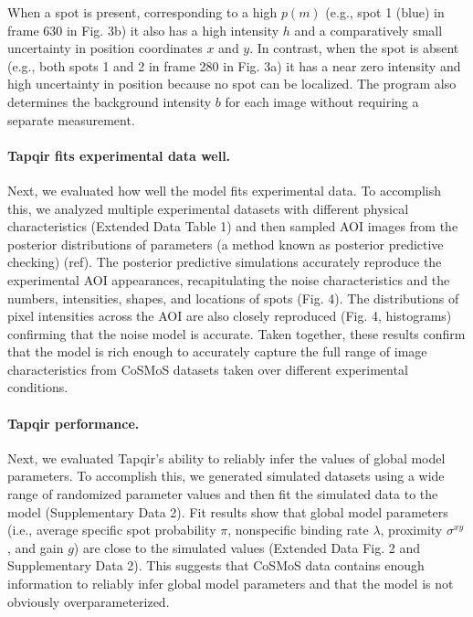 When a spot is present, corresponding to a high $p(m)$ (e.g., spot 1 (blue) in frame 630 in Fig. 3b) it also has a high intensity $h$ and a comparatively small uncertainty in position coordinates $x$ and $y$. In contrast, when the spot is absent (e.g., both spots 1 and 2 in frame 280 in Fig. 3a) it has a near zero intensity and high uncertainty in position because no spot can be localized. The program also determines the background intensity $b$ for each image without requiring a separate measurement. 


\paragraph{Tapqir fits experimental data well.}
Next, we evaluated how well the model fits experimental data. To accomplish this, we analyzed multiple experimental datasets with different physical characteristics (Extended Data Table 1) and then sampled AOI images from the posterior distributions of parameters (a method known as posterior predictive checking) (ref). The posterior predictive simulations accurately reproduce the experimental AOI appearances, recapitulating the noise characteristics and the numbers, intensities, shapes, and locations of spots (Fig. 4).  The distributions of pixel intensities across the AOI are also closely reproduced (Fig. 4, histograms) confirming that the noise model is accurate. Taken together, these results confirm that the model is rich enough to accurately capture the full range of image characteristics from CoSMoS datasets taken over different experimental conditions.

\paragraph{Tapqir performance.}
Next, we evaluated Tapqir's ability to reliably infer the values of global model parameters. To  accomplish this, we generated simulated datasets  using  a wide range of randomized parameter values and then fit the simulated data to the model (Supplementary Data 2). Fit results show that global model parameters (i.e., average specific spot probability $\pi$, nonspecific binding rate $\lambda$, proximity $\sigma^{xy}$, and gain $g$) are close to the simulated values  (Extended Data Fig. 2 and Supplementary Data 2). This suggests that CoSMoS data contains enough information to reliably infer global model parameters and that the model is not obviously overparameterized.

